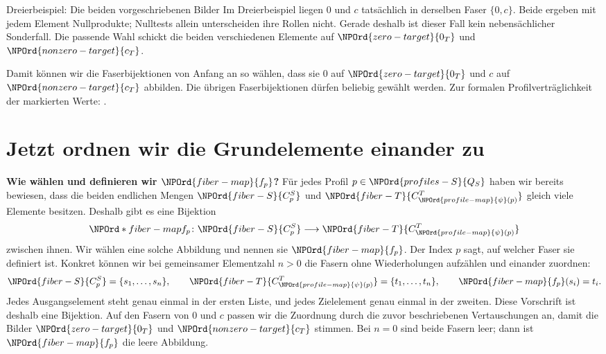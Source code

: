 \begin{NPReadingExample}{Dreierbeispiel: Die beiden vorgeschriebenen Bilder}
Im Dreierbeispiel liegen \(0\) und \(c\) tatsächlich in derselben
Faser \(\{0,c\}\). Beide ergeben mit jedem Element Nullprodukte;
Nulltests allein unterscheiden ihre Rollen nicht.
Gerade deshalb ist dieser Fall kein nebensächlicher Sonderfall.
Die passende Wahl schickt die beiden verschiedenen Elemente auf
\(\NPOrd{zero-target}{0_T}\) und \(\NPOrd{nonzero-target}{c_T}\).
\end{NPReadingExample}

Damit können wir die Faserbijektionen von Anfang an so wählen, dass
sie \(0\) auf \(\NPOrd{zero-target}{0_T}\) und \(c\) auf \(\NPOrd{nonzero-target}{c_T}\) abbilden.
Die übrigen Faserbijektionen dürfen beliebig gewählt werden.
Zur formalen Profilverträglichkeit der markierten Werte:
.

\section*{Jetzt ordnen wir die Grundelemente einander zu}

\noindent\textbf{Wie wählen und definieren wir \(\NPOrd{fiber-map}{f_p}\)?}
Für jedes Profil \(p\in \NPOrd{profiles-S}{Q_S}\) haben wir bereits bewiesen, dass
die beiden endlichen Mengen \(\NPOrd{fiber-S}{C_p^S}\) und \(\NPOrd{fiber-T}{C_{\NPOrd{profile-map}{\psi}(p)}^T}\)
gleich viele Elemente besitzen. Deshalb gibt es eine Bijektion
\[
 \NPOrd*{fiber-map}{f_p}\colon \NPOrd{fiber-S}{C_p^S}\longrightarrow \NPOrd{fiber-T}{C_{\NPOrd{profile-map}{\psi}(p)}^T}
\]
zwischen ihnen. Wir wählen eine solche Abbildung und nennen sie
\(\NPOrd{fiber-map}{f_p}\). Der Index \(p\) sagt, auf welcher Faser sie definiert ist.
Konkret können wir bei gemeinsamer Elementzahl \(n>0\) die Fasern
ohne Wiederholungen aufzählen und einander zuordnen:
\[
 \NPOrd{fiber-S}{C_p^S}=\{s_1,\ldots,s_n\},\qquad
 \NPOrd{fiber-T}{C_{\NPOrd{profile-map}{\psi}(p)}^T}=\{t_1,\ldots,t_n\},\qquad
 \NPOrd{fiber-map}{f_p}(s_i)=t_i.
\]
Jedes Ausgangselement steht genau einmal in der ersten Liste,
und jedes Zielelement genau einmal in der zweiten. Diese Vorschrift
ist deshalb eine Bijektion. Auf den Fasern von \(0\) und \(c\)
passen wir die Zuordnung durch die zuvor beschriebenen Vertauschungen
an, damit die Bilder \(\NPOrd{zero-target}{0_T}\) und \(\NPOrd{nonzero-target}{c_T}\) stimmen.
Bei \(n=0\) sind beide Fasern leer; dann ist \(\NPOrd{fiber-map}{f_p}\) die leere Abbildung.

